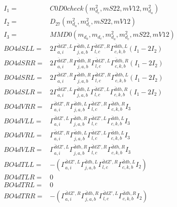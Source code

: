 \documentclass[A4,landscape]{article}
\begin{document}
\begin{align} 
I_1 = & C0D0check(m^2_{d_{{c}}}, mS22, mV12, m^2_{d_{{a}}}) \\ 
I_2 = & D_{27}(m^2_{d_{{a}}}, m^2_{d_{{c}}}, mS22, mV12) \\ 
I_3 = & MMD0(m_{d_{{a}}}, m_{d_{{c}}}, m^2_{d_{{a}}}, m^2_{d_{{c}}}, mS22, mV12) \\ 
  BO4dSLL= & 2  \Gamma^{\bar{d}d {Z'} ,L}_{a, i} \Gamma^{\bar{d}d h ,L}_{j, a, b} \Gamma^{\bar{d}d {Z'} ,R}_{l, c} \Gamma^{\bar{d}d h ,L}_{c, k, b} (I_1 - 2 I_2) \\ 
  BO4dSRR= & 2  \Gamma^{\bar{d}d {Z'} ,R}_{a, i} \Gamma^{\bar{d}d h ,R}_{j, a, b} \Gamma^{\bar{d}d {Z'} ,L}_{l, c} \Gamma^{\bar{d}d h ,R}_{c, k, b} (I_1 - 2 I_2) \\ 
  BO4dSRL= & 2  \Gamma^{\bar{d}d {Z'} ,R}_{a, i} \Gamma^{\bar{d}d h ,R}_{j, a, b} \Gamma^{\bar{d}d {Z'} ,R}_{l, c} \Gamma^{\bar{d}d h ,L}_{c, k, b} (I_1 - 2 I_2) \\ 
  BO4dSLR= & 2  \Gamma^{\bar{d}d {Z'} ,L}_{a, i} \Gamma^{\bar{d}d h ,L}_{j, a, b} \Gamma^{\bar{d}d {Z'} ,L}_{l, c} \Gamma^{\bar{d}d h ,R}_{c, k, b} (I_1 - 2 I_2) \\ 
  BO4dVRR= &  \Gamma^{\bar{d}d {Z'} ,R}_{a, i} \Gamma^{\bar{d}d h ,L}_{j, a, b} \Gamma^{\bar{d}d {Z'} ,R}_{l, c} \Gamma^{\bar{d}d h ,R}_{c, k, b} I_3 \\ 
  BO4dVLL= &  \Gamma^{\bar{d}d {Z'} ,L}_{a, i} \Gamma^{\bar{d}d h ,R}_{j, a, b} \Gamma^{\bar{d}d {Z'} ,L}_{l, c} \Gamma^{\bar{d}d h ,L}_{c, k, b} I_3 \\ 
  BO4dVRL= &  \Gamma^{\bar{d}d {Z'} ,R}_{a, i} \Gamma^{\bar{d}d h ,L}_{j, a, b} \Gamma^{\bar{d}d {Z'} ,L}_{l, c} \Gamma^{\bar{d}d h ,L}_{c, k, b} I_3 \\ 
  BO4dVLR= &  \Gamma^{\bar{d}d {Z'} ,L}_{a, i} \Gamma^{\bar{d}d h ,R}_{j, a, b} \Gamma^{\bar{d}d {Z'} ,R}_{l, c} \Gamma^{\bar{d}d h ,R}_{c, k, b} I_3 \\ 
  BO4dTLL= & -( \Gamma^{\bar{d}d {Z'} ,L}_{a, i} \Gamma^{\bar{d}d h ,L}_{j, a, b} \Gamma^{\bar{d}d {Z'} ,R}_{l, c} \Gamma^{\bar{d}d h ,L}_{c, k, b} I_2) \\ 
  BO4dTLR= & 0 \\ 
  BO4dTRL= & 0 \\ 
  BO4dTRR= & -( \Gamma^{\bar{d}d {Z'} ,R}_{a, i} \Gamma^{\bar{d}d h ,R}_{j, a, b} \Gamma^{\bar{d}d {Z'} ,L}_{l, c} \Gamma^{\bar{d}d h ,R}_{c, k, b} I_2) \\ 
\end{align} 
\end{document}
